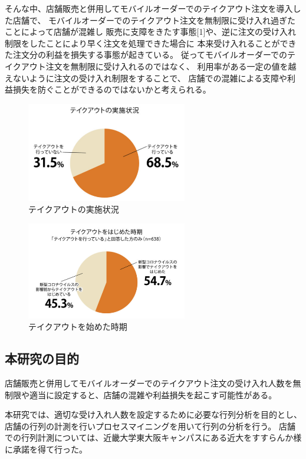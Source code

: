 \documentclass{jsarticle}
\begin{document}
そんな中、店舗販売と併用してモバイルオーダーでのテイクアウト注文を導入した店舗で、
モバイルオーダーでのテイクアウト注文を無制限に受け入れ過ぎたことによって店舗が混雑し
販売に支障をきたす事態[1]や、逆に注文の受け入れ制限をしたことにより早く注文を処理できた場合に
本来受け入れることができた注文分の利益を損失する事態が起きている。
従ってモバイルオーダーでのテイクアウト注文を無制限に受け入れるのではなく、
利用率がある一定の値を越えないように注文の受け入れ制限をすることで、
店舗での混雑による支障や利益損失を防ぐことができるのではないかと考えられる。

\begin{figure}[H]
  \centering
  \includegraphics[width=7cm]{1.png}
  \caption{テイクアウトの実施状況}
  \label{fig:1}
\end{figure}

\begin{figure}[H]
  \centering
  \includegraphics[width=7cm]{2.png}
  \caption{テイクアウトを始めた時期}
  \label{fig:2}
\end{figure}



\newpage


\subsection{本研究の目的}
店舗販売と併用してモバイルオーダーでのテイクアウト注文の受け入れ人数を無制限や適当に設定すると、店舗の混雑や利益損失を起こす可能性がある。

本研究では、適切な受け入れ人数を設定するために必要な行列分析を目的とし、
店舗の行列の計測を行いプロセスマイニングを用いて行列の分析を行う。
店舗での行列計測については、近畿大学東大阪キャンパスにある近大をすすらんか様に承諾を得て行った。
\end{document}
